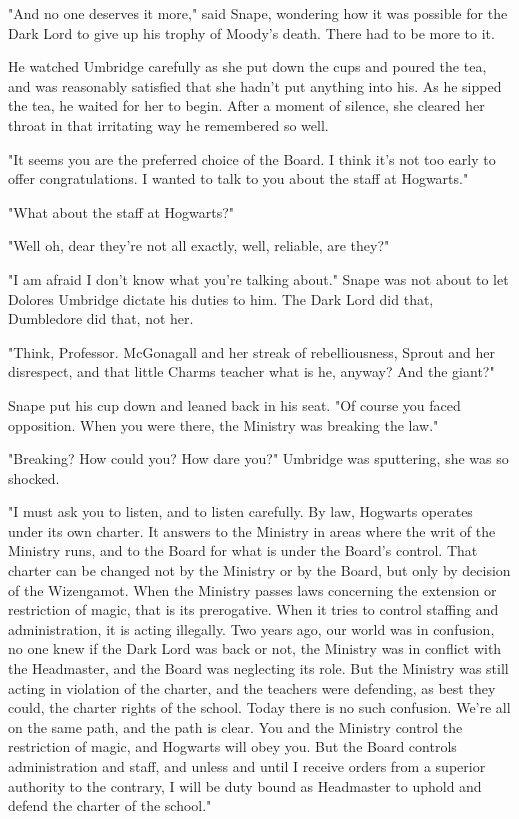 "And no one deserves it more," said Snape, wondering how it was possible for the Dark Lord to give up his trophy of Moody's death. There had to be more to it.

He watched Umbridge carefully as she put down the cups and poured the tea, and was reasonably satisfied that she hadn't put anything into his. As he sipped the tea, he waited for her to begin. After a moment of silence, she cleared her throat in that irritating way he remembered so well.

"It seems you are the preferred choice of the Board. I think it's not too early to offer congratulations. I wanted to talk to you about the staff at Hogwarts."

"What about the staff at Hogwarts?"

"Well{\el} oh, dear{\el} they're not all exactly, well, reliable, are they?"

"I am afraid I don't know what you're talking about." Snape was not about to let Dolores Umbridge dictate his duties to him. The Dark Lord did that, Dumbledore did that, not her.

"Think, Professor. McGonagall and her streak of rebelliousness, Sprout and her disrespect, and that little Charms teacher{\el} what is he, anyway? And the giant?"

Snape put his cup down and leaned back in his seat. "Of course you faced opposition. When you were there, the Ministry was breaking the law."

"Breaking{\el}? How could you? How dare you?" Umbridge was sputtering, she was so shocked.

"I must ask you to listen, and to listen carefully. By law, Hogwarts operates under its own charter. It answers to the Ministry in areas where the writ of the Ministry runs, and to the Board for what is under the Board's control. That charter can be changed not by the Ministry or by the Board, but only by decision of the Wizengamot. When the Ministry passes laws concerning the extension or restriction of magic, that is its prerogative. When it tries to control staffing and administration, it is acting illegally. Two years ago, our world was in confusion, no one knew if the Dark Lord was back or not, the Ministry was in conflict with the Headmaster, and the Board was neglecting its role. But the Ministry was still acting in violation of the charter, and the teachers were defending, as best they could, the charter rights of the school. Today there is no such confusion. We're all on the same path, and the path is clear. You and the Ministry control the restriction of magic, and Hogwarts will obey you. But the Board controls administration and staff, and unless and until I receive orders from a superior authority to the contrary, I will be duty bound as Headmaster to uphold and defend the charter of the school."

